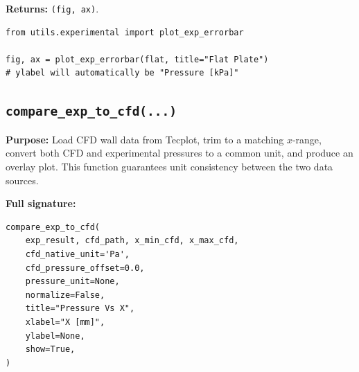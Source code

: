\documentclass[11pt, letterpaper]{article}
\begin{document}
\textbf{Returns:} \texttt{(fig, ax)}.

\begin{lstlisting}[caption={Plotting experimental error bars.}]
from utils.experimental import plot_exp_errorbar

fig, ax = plot_exp_errorbar(flat, title="Flat Plate")
# ylabel will automatically be "Pressure [kPa]"
\end{lstlisting}

\subsection{\texttt{compare\_exp\_to\_cfd(...)}}
\label{subsec:compare_exp_to_cfd}

\textbf{Purpose:} Load CFD wall data from Tecplot, trim to a matching
$x$-range, convert both CFD and experimental pressures to a common unit,
and produce an overlay plot. This function guarantees unit consistency
between the two data sources.

\textbf{Full signature:}
\begin{lstlisting}[numbers=none]
compare_exp_to_cfd(
    exp_result, cfd_path, x_min_cfd, x_max_cfd,
    cfd_native_unit='Pa',
    cfd_pressure_offset=0.0,
    pressure_unit=None,
    normalize=False,
    title="Pressure Vs X",
    xlabel="X [mm]",
    ylabel=None,
    show=True,
)
\end{lstlisting}
\end{document}
